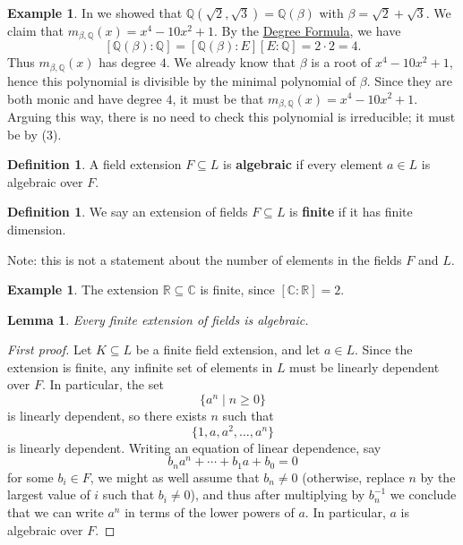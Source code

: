 \documentclass[12pt]{report}
\newtheorem{lemma}[theorem]{Lemma}
\numberwithin{equation}{section}
\numberwithin{theorem}{chapter}
\theoremstyle{definition}
\newtheorem{definition}[theorem]{Definition}
\newtheorem{example}[theorem]{Example}
\newtheorem*{basic properties}{Basic Properties}
\newtheorem*{Important Remark}{Important Remark}
\newcommand{\C}{\mathbb{C}}
\begin{document}
\begin{example}\label{example degree root 2 + 3}
In  we showed that $\mathbb{Q}(\sqrt{2},\sqrt{3}) = \mathbb{Q}(\beta)$ with $\beta = \sqrt{2} + \sqrt{3}$. We claim that $m_{\beta, \mathbb{Q}}(x)=x^4-10x^2+1$. By the \hyperref[deg formula]{Degree Formula}, we have 
$$[\mathbb{Q}(\beta):\mathbb{Q}] = [\mathbb{Q}(\beta):E][E:\mathbb{Q}] = 2\cdot 2= 4.$$
Thus $m_{\beta, \mathbb{Q}}(x)$ has degree $4$. We already know that $\beta$ is a root of $x^4 - 10 x^2 + 1$, hence this polynomial is divisible by the minimal polynomial of $\beta$. Since they are both monic and have degree $4$, it must be that $m_{\beta,\mathbb{Q}}(x)=x^4 - 10 x^2 + 1$. Arguing this way, there is no need to check this polynomial is irreducible; it must be by  (3).
\end{example}



\begin{definition}
A field extension $F \subseteq L$ is {\bf algebraic} if every element $a \in L$ is algebraic over $F$.
\end{definition}

\begin{definition}
	We say an extension of fields $F \subseteq L$ is {\bf finite} if it has finite dimension.
\end{definition}

Note: this is not a statement about the number of elements in the fields $F$ and $L$.

\begin{example}
	The extension $\mathbb{R} \subseteq \C$ is finite, since $[\C : \mathbb{R}] = 2$.
\end{example}

\begin{lemma}\label{finite extension algebraic}
	Every finite extension of fields is algebraic.
\end{lemma}


\begin{proof}[First proof]
	Let $K \subseteq L$ be a finite field extension, and let $a \in L$. Since the extension is finite, any infinite set of elements in $L$ must be linearly dependent over $F$. In particular, the set
	$$\{ a^n \mid n \geqslant 0 \}$$
	is linearly dependent, so there exists $n$ such that
	$$\{ 1, a, a^2, \ldots, a^n \}$$
	is linearly dependent. Writing an equation of linear dependence, say
	$$b_n a^n + \cdots + b_1a + b_0 = 0$$
	for some $b_i \in F$, we might as well assume that $b_n \neq 0$ (otherwise, replace $n$ by the largest value of $i$ such that $b_i \neq 0$), and thus after multiplying by $b_n^{-1}$ we conclude that we can write $a^n$ in terms of the lower powers of $a$. In particular, $a$ is algebraic over $F$.	
\end{proof}
\end{document}
